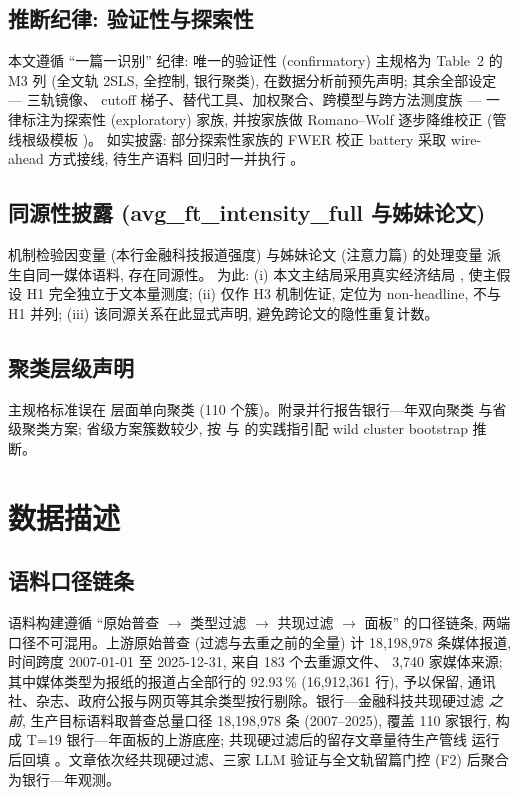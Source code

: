 \subsection{推断纪律: 验证性与探索性}
本文遵循 ``一篇一识别'' 纪律: 唯一的验证性 (confirmatory) 主规格为 Table~2 的 M3 列
(全文轨 2SLS, 全控制, 银行聚类), 在数据分析前预先声明; 其余全部设定 --- 三轨镜像、
cutoff 梯子、替代工具、加权聚合、跨模型与跨方法测度族 --- 一律标注为探索性
(exploratory) 家族, 并按家族做 Romano--Wolf 逐步降维校正
\parencite{romano2005stepdown} (管线根级模板 )。
如实披露: 部分探索性家族的 FWER 校正 battery 采取 wire-ahead 方式接线, 待生产语料
回归时一并执行 。

\subsection{同源性披露 (avg\_ft\_intensity\_full 与姊妹论文)}
机制检验因变量  (本行金融科技报道强度) 与姊妹论文
(注意力篇) 的处理变量  派生自同一媒体语料, 存在同源性。
为此: (i) 本文主结局采用真实经济结局 , 使主假设 H1 完全独立于文本量测度;
(ii)  仅作 H3 机制佐证, 定位为 non-headline, 不与 H1
并列; (iii) 该同源关系在此显式声明, 避免跨论文的隐性重复计数。

\subsection{聚类层级声明}
主规格标准误在  层面单向聚类 (110 个簇)。附录并行报告银行—年双向聚类
与省级聚类方案; 省级方案簇数较少, 按 \textcite{mackinnon2023cluster} 与
\textcite{cameron2015practitioner} 的实践指引配 wild cluster bootstrap 推断。

\section{数据描述}\label{sec:data}

\subsection{语料口径链条}
语料构建遵循 ``原始普查 $\rightarrow$ 类型过滤 $\rightarrow$ 共现过滤 $\rightarrow$
面板'' 的口径链条, 两端口径不可混用。上游原始普查 (过滤与去重之前的全量) 计
18{,}198{,}978 条媒体报道, 时间跨度 2007-01-01 至 2025-12-31, 来自 183 个去重源文件、
3{,}740 家媒体来源; 其中媒体类型为报纸的报道占全部行的 92.93\,\% (16{,}912{,}361 行),
予以保留, 通讯社、杂志、政府公报与网页等其余类型按行剔除。银行—金融科技共现硬过滤
\emph{之前}, 生产目标语料取普查总量口径 18{,}198{,}978 条 (2007--2025),
覆盖 110 家银行, 构成 T=19 银行—年面板的上游底座; 共现硬过滤后的留存文章量待生产管线
运行后回填 。文章依次经共现硬过滤、三家 LLM
验证与全文轨留篇门控 (F2) 后聚合为银行—年观测。

